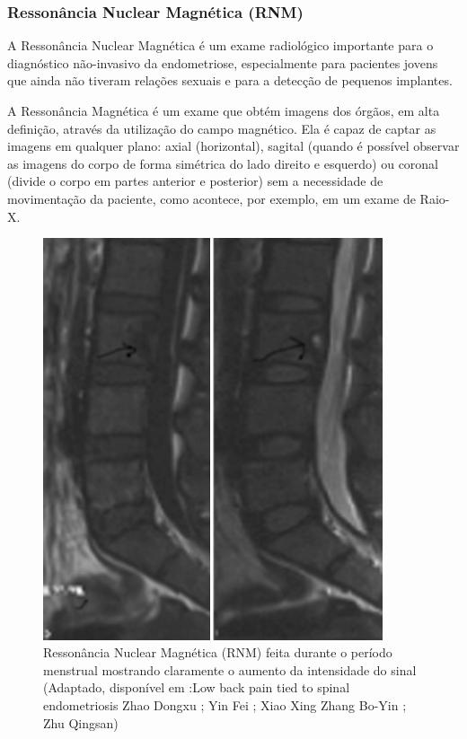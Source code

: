 \documentclass[12pt]{article} %
\begin{document}
\subsubsection{Ressonância Nuclear Magnética (RNM)}

A Ressonância Nuclear Magnética é um exame radiológico importante para o diagnóstico não-invasivo da endometriose, especialmente para pacientes jovens que ainda não tiveram relações sexuais e para a detecção de pequenos implantes.

A Ressonância Magnética é um exame que obtém imagens dos órgãos, em alta definição, através da utilização do campo magnético. Ela é capaz de captar as imagens em qualquer plano: axial (horizontal), sagital (quando é possível observar as imagens do corpo de forma simétrica do lado direito e esquerdo) ou coronal (divide o corpo em partes anterior e posterior) sem a necessidade de movimentação da paciente, como acontece, por exemplo, em um exame de Raio-X.

\begin{figure}[h!]
\centering
\includegraphics[width=10cm]{RNM.png}
\caption[Ressonância Nuclear Magnética (RNM) feita durante o período menstrual mostrando claramente o aumento da intensidade do sinal]{Ressonância Nuclear Magnética (RNM) feita durante o período menstrual mostrando claramente o aumento da intensidade do sinal (Adaptado, disponível em :Low back pain tied to spinal endometriosis
Zhao Dongxu ; Yin Fei ; Xiao Xing
Zhang Bo-Yin ; Zhu Qingsan)}
\end{figure}
\newpage
\end{document}
